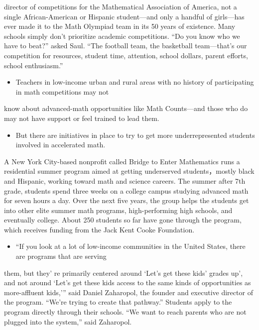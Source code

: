 \documentclass[UTF8,11pt]{ctexart}
\begin{document}
director of competitions for the Mathematical Association of America, not a single African-American or Hispanic student---and only a handful of girls---has ever made it to the Math Olympiad team in its 50 years of existence. Many schools simply don’t prioritize academic competitions. “Do you know who we have to beat?” asked Saul. “The football team, the basketball team---that’s our competition for resources, student time, attention, school dollars, parent efforts, school enthusiasm.”


\begin{itemize}[leftmargin=2em,itemsep=.2em,topsep=.4em]\item[K.] Teachers in low-income urban and rural areas with no history of participating in math competitions may not
\end{itemize}

know about advanced-math opportunities like Math Counts—and those who do may not have support or feel trained to lead them.


\begin{itemize}[leftmargin=2em,itemsep=.2em,topsep=.4em]\item[L.] But there are initiatives in place to try to get more underrepresented students involved in accelerated math.
\end{itemize}

A New York City-based nonprofit called Bridge to Enter Mathematics runs a residential summer program aimed at getting underserved students，mostly black and Hispanic, working toward math and science careers. The summer after 7th grade, students spend three weeks on a college campus studying advanced math for seven hours a day. Over the next five years, the group helps the students get into other elite summer math programs, high-performing high schools, and eventually college. About 250 students so far have gone through the program, which receives funding from the Jack Kent Cooke Foundation.


\begin{itemize}[leftmargin=2em,itemsep=.2em,topsep=.4em]\item[M.] “If you look at a lot of low-income communities in the United States, there are programs that are serving
\end{itemize}

them, but they’ re primarily centered around ‘Let’s get these kids’ grades up’, and not around ‘Let’s get these kids access to the same kinds of opportunities as more-affluent kids,’” said Daniel Zaharopol, the founder and executive director of the program. “We’re trying to create that pathway.” Students apply to the program directly through their schools. “We want to reach parents who are not plugged into the system,” said Zaharopol.
\end{document}
